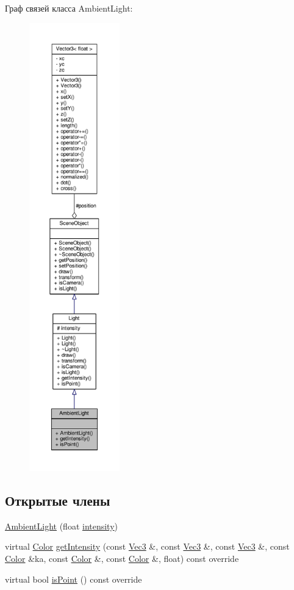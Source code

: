 Граф связей класса Ambient\+Light\+:
\nopagebreak
\begin{figure}[H]
\begin{center}
\leavevmode
\includegraphics[height=550pt]{dd/d59/class_ambient_light__coll__graph}
\end{center}
\end{figure}
\subsection*{Открытые члены}
\begin{DoxyCompactItemize}
\item 
\hyperlink{class_ambient_light_a81a7a88347dddaf2fdec12d6d2793f8b}{Ambient\+Light} (float \hyperlink{class_light_a1071eaa556f4bb2a9345fdfba7e6f220}{intensity})
\item 
virtual \hyperlink{class_color}{Color} \hyperlink{class_ambient_light_aebbccf2534a3cbe399ccddc552d1a49d}{get\+Intensity} (const \hyperlink{vec3_8h_a221ad8ea4d9be4111628ee1ca22ee3ba}{Vec3} \&, const \hyperlink{vec3_8h_a221ad8ea4d9be4111628ee1ca22ee3ba}{Vec3} \&, const \hyperlink{vec3_8h_a221ad8ea4d9be4111628ee1ca22ee3ba}{Vec3} \&, const \hyperlink{class_color}{Color} \&ka, const \hyperlink{class_color}{Color} \&, const \hyperlink{class_color}{Color} \&, float) const override
\item 
virtual bool \hyperlink{class_ambient_light_accccb9b3c5f0a9c38dceaef386c2964a}{is\+Point} () const override
\end{DoxyCompactItemize}
